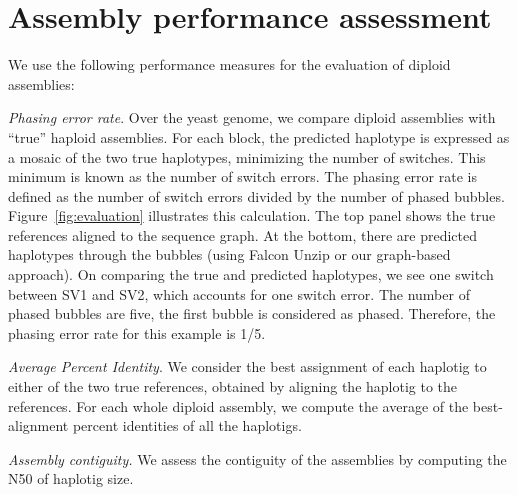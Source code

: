 \section{Assembly performance assessment}
We use the following performance measures for the evaluation of diploid assemblies:

\textit{Phasing error rate}. Over the yeast genome, we compare diploid assemblies with ``true'' haploid assemblies.
For each block, the predicted haplotype is expressed as a mosaic of the two true haplotypes, minimizing the number of switches. 
This minimum is known as the number of switch errors.
The phasing error rate is defined as the number of switch errors divided by the number of phased bubbles.
Figure~\ref{fig:evaluation} illustrates this calculation.  The top panel shows the true references aligned to the sequence graph. At the bottom, there are predicted haplotypes through the bubbles (using Falcon Unzip or our graph-based approach).
On comparing the true and predicted haplotypes, we see one switch between SV1 and SV2, which accounts for one switch error. The number of phased bubbles are five, the first bubble is considered as phased.
Therefore, the phasing error rate for this example is 1/5.

\textit{Average Percent Identity}. We consider the best assignment of each haplotig to either of the two true references, obtained by aligning the haplotig to the references.
For each whole diploid assembly, we compute the average of the best-alignment percent identities of all the haplotigs. 

\textit{Assembly contiguity.} We assess the contiguity of the assemblies by computing the N50 of haplotig size. 

